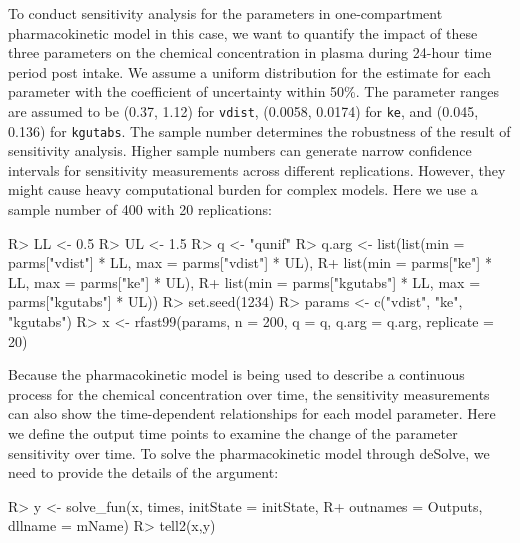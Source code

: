 \documentclass[article]{jss}
\begin{document}
To conduct sensitivity analysis for the parameters in one-compartment
pharmacokinetic model in this case, we want to quantify the impact of
these three parameters on the chemical concentration in plasma during
24-hour time period post intake. We assume a uniform distribution for
the estimate for each parameter with the coefficient of uncertainty
within 50\%. The parameter ranges are assumed to be (0.37, 1.12) for
\texttt{vdist}, (0.0058, 0.0174) for \texttt{ke}, and (0.045, 0.136) for
\texttt{kgutabs}. The sample number determines the robustness of the
result of sensitivity analysis. Higher sample numbers can generate
narrow confidence intervals for sensitivity measurements across
different replications. However, they might cause heavy computational
burden for complex models. Here we use a sample number of 400 with 20
replications:

\begin{CodeChunk}

\begin{CodeInput}
R> LL <- 0.5 
R> UL <- 1.5
R> q <- "qunif"
R> q.arg <- list(list(min = parms["vdist"] * LL, max = parms["vdist"] * UL),
R+              list(min = parms["ke"] * LL, max = parms["ke"] * UL), 
R+              list(min = parms["kgutabs"] * LL, max = parms["kgutabs"] * UL)) 
R> set.seed(1234)
R> params <- c("vdist", "ke", "kgutabs")
R> x <- rfast99(params, n = 200, q = q, q.arg = q.arg, replicate = 20)
\end{CodeInput}
\end{CodeChunk}

Because the pharmacokinetic model is being used to describe a continuous
process for the chemical concentration over time, the sensitivity
measurements can also show the time-dependent relationships for each
model parameter. Here we define the output time points to examine the
change of the parameter sensitivity over time. To solve the
pharmacokinetic model through deSolve, we need to provide the details of
the argument:

\begin{CodeChunk}

\begin{CodeInput}
R> y <- solve_fun(x, times, initState = initState,
R+                outnames = Outputs, dllname = mName)
R> tell2(x,y)
\end{CodeInput}
\end{CodeChunk}
\end{document}
